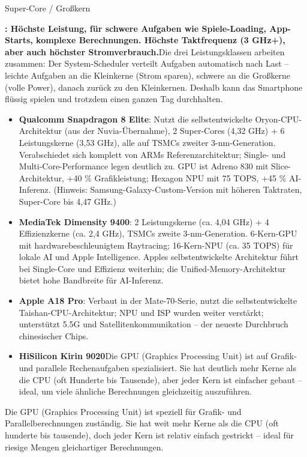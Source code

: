 Super-Core / Großkern

\textbf{: Höchste Leistung, für schwere Aufgaben wie Spiele-Loading, App-Starts, komplexe Berechnungen. Höchste Taktfrequenz (3 GHz+), aber auch höchster Stromverbrauch.}Die drei Leistungsklassen arbeiten zusammen: Der System-Scheduler verteilt Aufgaben automatisch nach Last – leichte Aufgaben an die Kleinkerne (Strom sparen), schwere an die Großkerne (volle Power), danach zurück zu den Kleinkernen. Deshalb kann das Smartphone flüssig spielen und trotzdem einen ganzen Tag durchhalten.

\begin{itemize}
  \item \textbf{Qualcomm Snapdragon 8 Elite}: Nutzt die selbstentwickelte Oryon-CPU-Architektur (aus der Nuvia-Übernahme), 2 Super-Cores (4,32 GHz) + 6 Leistungskerne (3,53 GHz), alle auf TSMCs zweiter 3-nm-Generation. Verabschiedet sich komplett von ARMs Referenzarchitektur; Single- und Multi-Core-Performance legen deutlich zu. GPU ist Adreno 830 mit Slice-Architektur, +40 \% Grafikleistung; Hexagon NPU mit 75 TOPS, +45 \% AI-Inferenz. (Hinweis: Samsung-Galaxy-Custom-Version mit höheren Taktraten, Super-Core bis 4,47 GHz.)
  \item \textbf{MediaTek Dimensity 9400}: 2 Leistungskerne (ca. 4,04 GHz) + 4 Effizienzkerne (ca. 2,4 GHz), TSMCs zweite 3-nm-Generation. 6-Kern-GPU mit hardwarebeschleunigtem Raytracing; 16-Kern-NPU (ca. 35 TOPS) für lokale AI und Apple Intelligence. Apples selbstentwickelte Architektur führt bei Single-Core und Effizienz weiterhin; die Unified-Memory-Architektur bietet hohe Bandbreite für AI-Inferenz.
  \item \textbf{Apple A18 Pro}: Verbaut in der Mate-70-Serie, nutzt die selbstentwickelte Taishan-CPU-Architektur; NPU und ISP wurden weiter verstärkt; unterstützt 5.5G und Satellitenkommunikation – der neueste Durchbruch chinesischer Chips.
  \item \textbf{HiSilicon Kirin 9020}Die GPU (Graphics Processing Unit) ist auf Grafik- und parallele Rechenaufgaben spezialisiert. Sie hat deutlich mehr Kerne als die CPU (oft Hunderte bis Tausende), aber jeder Kern ist einfacher gebaut – ideal, um viele ähnliche Berechnungen gleichzeitig auszuführen.
\end{itemize}


Die GPU (Graphics Processing Unit) ist speziell für Grafik- und Parallelberechnungen zuständig. Sie hat weit mehr Kerne als die CPU (oft hunderte bis tausende), doch jeder Kern ist relativ einfach gestrickt – ideal für riesige Mengen gleichartiger Berechnungen.

